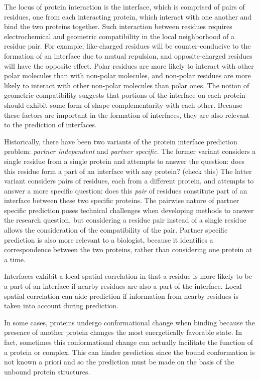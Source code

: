 The locus of protein interaction is the interface, which is comprised of pairs of residues, one from each interacting protein, which interact with one another and bind the two proteins together.
Such interaction between residues requires electrochemical and geometric compatibility in the local neighborhood of a residue pair.
For example, like-charged residues will be counter-conducive to the formation of an interface due to mutual repulsion, and opposite-charged residues will have the opposite effect.
Polar residues are more likely to interact with other polar molecules than with non-polar molecules, and non-polar residues are more likely to interact with other non-polar molecules than polar ones.
The notion of geometric compatibility suggests that portions of the interface on each protein should exhibit some form of shape complementarity with each other. 
Because these factors are important in the formation of interfaces, they are also relevant to the prediction of interfaces.

Historically, there have been two variants of the protein interface prediction problem: \textit{partner independent} and \textit{partner specific}.
The former variant considers a single residue from a single protein and attempts to answer the question: does this residue form a part of an interface with any protein? (check this)
The latter variant considers pairs of residues, each from a different protein, and attempts to answer a more specific question: does this \textit{pair} of residues constitute part of an interface between these two specific proteins. 
The pairwise nature of partner specific prediction poses technical challenges when developing methods to answer the research question, but considering a residue pair instead of a single residue allows the consideration of the compatibility of the pair.
Partner specific prediction is also more relevant to a biologist, because it identifies a correspondence between the two proteins, rather than considering one protein at a time.

Interfaces exhibit a local spatial correlation in that a residue is more likely to be a part of an interface if nearby residues are also a part of the interface. 
Local spatial correlation can aide prediction if information from nearby residues is taken into account during prediction.

In some cases, proteins undergo conformational change when binding because the presence of another protein changes the most energetically favorable state. 
In fact, sometimes this conformational change can actually facilitate the function of a protein or complex.
This can hinder prediction since the bound conformation is not known a priori and so the prediction must be made on the basis of the unbound protein structures. 

